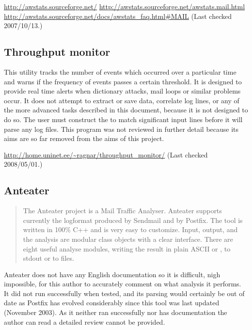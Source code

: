 
\noindent\url{http://awstats.sourceforge.net/} \newline
\url{http://awstats.sourceforge.net/awstats.mail.html} \newline
\url{http://awstats.sourceforge.net/docs/awstats_faq.html#MAIL}
\newline (Last checked 2007/10/13.)

\subsection{Throughput monitor}

This utility tracks the number of events which occurred over a particular
time and warns if the frequency of events passes a certain threshold.  It
is designed to provide real time alerts when dictionary attacks, mail loops
or similar problems occur. It does not attempt to extract or save data,
correlate log lines, or any of the more advanced tasks described in this
document, because it is not designed to do so.  The user must construct the
\regexes{} to match significant input lines before it will parse any log
files.  This program was not reviewed in further detail because its aims
are so far removed from the aims of this project.

\url{http://home.uninet.ee/~ragnar/throughput_monitor/} \newline (Last
checked 2008/05/01.)

\subsection{Anteater}

\begin{quotation}

    The Anteater project is a Mail Traffic Analyser. Anteater supports
    currently the logformat produced by Sendmail and by Postfix. The tool
    is written in 100\% C++ and is very easy to customize. Input, output,
    and the analysis are modular class objects with a clear interface.
    There are eight useful analyse modules, writing the result in plain
    ASCII or \HTML{}, to stdout or to files.

\end{quotation}

Anteater does not have any English documentation so it is difficult, nigh
impossible, for this author to accurately comment on what analysis it
performs.  It did not run successfully when tested, and its parsing would
certainly be out of date as Postfix has evolved considerably since this
tool was last updated (November 2003).  As it neither ran successfully nor
has documentation the author can read a detailed review cannot be provided.

